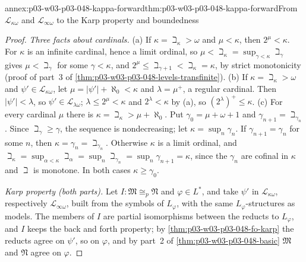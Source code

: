 

\begin{annexitem}{annex:p03-w03-p03-048-kappa-forward}{thm:p03-w03-p03-048-kappa-forward}{From \(\mathcal L_{\kappa\omega}\) and \(\mathcal L_{\infty\omega}\) to the Karp property and boundedness}
\begin{proof}
\emph{Three facts about cardinals.}  (a) If \(\kappa=\beth_\kappa>\omega\)
and \(\mu<\kappa\), then \(2^{\mu}<\kappa\).  For \(\kappa\) is an infinite
cardinal, hence a limit ordinal, so \(\mu<\beth_\kappa=\sup_{\gamma<\kappa}
\beth_\gamma\) gives \(\mu<\beth_\gamma\) for some \(\gamma<\kappa\), and
\(2^{\mu}\leq\beth_{\gamma+1}<\beth_\kappa=\kappa\), by strict monotonicity
(proof of part~3 of \cref{thm:p03-w03-p03-048-levels-transfinite}).
(b) If \(\kappa=\beth_\kappa>\omega\) and \(\psi'\in\mathcal L_{\kappa\omega}\),
let \(\mu=|\psi'|+\aleph_0<\kappa\) and \(\lambda=\mu^{+}\), a regular
cardinal.  Then \(|\psi'|<\lambda\), so \(\psi'\in\mathcal L_{\lambda\omega}\);
\(\lambda\leq2^{\mu}<\kappa\) and \(2^{\lambda}<\kappa\) by (a), so
\((2^{\lambda})^{+}\leq\kappa\).  (c) For every cardinal \(\mu\) there is
\(\kappa=\beth_\kappa>\mu+\aleph_0\).  Put \(\gamma_0=\mu+\omega+1\) and
\(\gamma_{n+1}=\beth_{\gamma_n}\).  Since \(\beth_\gamma\geq\gamma\), the
sequence is nondecreasing; let \(\kappa=\sup_n\gamma_n\).  If
\(\gamma_{n+1}=\gamma_n\) for some \(n\), then \(\kappa=\gamma_n=
\beth_{\gamma_n}\).  Otherwise \(\kappa\) is a limit ordinal, and
\(\beth_\kappa=\sup_{\alpha<\kappa}\beth_\alpha=\sup_n\beth_{\gamma_n}=
\sup_n\gamma_{n+1}=\kappa\), since the \(\gamma_n\) are cofinal in
\(\kappa\) and \(\beth\) is monotone.  In both cases \(\kappa\geq\gamma_0\).

\emph{Karp property (both parts).}  Let \(I:\mathfrak M\cong_p\mathfrak N\)
and \(\varphi\in L^{\ast}\), and take \(\psi'\) in
\(\mathcal L_{\kappa\omega}\), respectively \(\mathcal L_{\infty\omega}\),
built from the symbols of \(L_\varphi\), with the same
\(L_\varphi\)-structures as models.  The members of \(I\) are partial
isomorphisms between the reducts to \(L_\varphi\), and \(I\) keeps the back
and forth property; by \cref{thm:p03-w03-p03-048-fo-karp} the reducts agree
on \(\psi'\), so on \(\varphi\), and by part~2 of
\cref{thm:p03-w03-p03-048-basic} \(\mathfrak M\) and \(\mathfrak N\) agree
on \(\varphi\).


\end{proof}
\end{annexitem}
